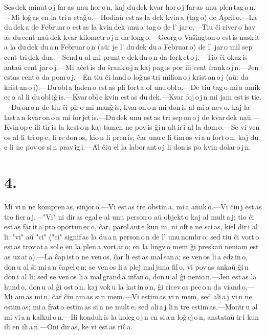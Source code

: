 \documentclass[ngerman,12pt,twoside]{book}
\begin{document}
Ses\,dek minut\,o\,j far\,as unu hor\,o\,n, kaj du\,dek kvar hor\,o\,j far\,as unu plen\,tag\,o\,n.---Mi loĝ\,as en la tri\,a etaĝ\,o.---Hodiaŭ est\,as la dek kvin\,a (tag\,o) de April\,o.---La du\,dek\,a de Februar\,o est\,as la kvin\,dek unu\,a tag\,o de l' jar\,o.---Tiu ĉi river\,o hav\,as du\,cent naŭ\,dek kvar kilometr\,o\,j\,n da long\,o.---Georg\,o Vaŝington\,o est\,is nask\,it\,a la du\,dek du\,a\,n Februar\,o\,n (aŭ: je l' du\,dek du\,a Februar\,o) de l' jar\,o mil sep\,cent tri\,dek dua.---Send\,u al mi prunt\,e dek\,du\,o\,n da fork\,et\,o\,j.---Tio ĉi okaz\,is antaŭ cent jar\,o\,j.---Mi aĉet\,is du ŝrank\,o\,j\,n kaj pag\,is por ili cent frank\,o\,j\,n.---Jen estas cent\,o da pom\,o\,j.---En tiu ĉi land\,o loĝ\,as tri milion\,o\,j krist\,an\,o\,j (aŭ: da krist\,an\,o\,j).---Du\,obl\,a faden\,o est\,as pli fort\,a ol unu\,obl\,a.---De tiu tag\,o mi\,a amik\,ec\,o al li du\,obl\,iĝ\,is.---Kvar\,obl\,e kvin est\,as du\,dek.---Kvar foj\,o\,j\,n mi jam est\,is tie.---Du\,on\,o\,n de tiu ĉi pir\,o mi manĝ\,is, kvar\,on\,o\,n mi don\,is al mi\,a nev\,o, kaj la last\,a\,n kvar\,on\,o\,n mi for\,ĵet\,is.---Du\,dek unu est\,as tri sep\,on\,o\,j de kvar\,dek naŭ.---Kvin\,op\,e ili tir\,is la kest\,o\,n kaj tamen ne pov\,is ĝi\,n alt\,ir\,i al la dom\,o.---Se vi ven\,os al li tri\,op\,e, li re\,don\,os, kio\,n li pren\,is; ĉar unu\,e li tim\,os vi\,a\,n fort\,o\,n, kaj du\,e li ne pov\,os si\,n prav\,ig\,i.---Al ĉiu el la labor\,ant\,o\,j li don\,is po kvin dolar\,o\,j\,n. 

\section*{4.}

Mi vi\,n ne kompren\,as, sinjor\,o.---Vi est\,as tre obstin\,a, mi\,a amik\,o.---Vi ĉiu\,j est\,as tro fier\,a\,j.---"Vi" ni dir\,as egal\,e al unu person\,o aŭ objekt\,o kaj al mult\,a\,j; tio ĉi est\,as far\,it\,a pro oportun\,ec\,o, ĉar, parol\,ant\,e kun iu, ni oft\,e ne sci\,as, kiel dir\,i al li: "vi" aŭ "ci" ("ci" signif\,as la du\,a\,n person\,o\,n de l' unu\,nombr\,o; sed tiu ĉi vort\,o est\,as trov\,at\,a sol\,e en la plen\,a vort\,ar\,o; en la lingv\,o mem ĝi preskaŭ neniam est\,as uz\,at\,a).---La ĉap\,ist\,o ne ven\,os, ĉar li est\,as mal\,san\,a; se ven\,os li\,a edz\,in\,o, don\,u al ŝi mi\,a\,n ĉapel\,o\,n; se ven\,os li\,a plej mal\,juna fil\,o, vi pov\,as ankaŭ ĝi\,n don\,i al li; sed se ven\,os li\,a mal\,grand\,a infan\,o, don\,u al ĝi nenio\,n.---Jen est\,as la hund\,o, don\,u al ĝi ost\,o\,n, kaj vok\,u la kat\,in\,o\,n, ĝi ricev\,os pec\,o\,n da viand\,o.---Mi am\,as mi\,n, ĉar ĉiu am\,as si\,n mem.---Vi estim\,as vi\,n mem, sed ali\,a\,j vi\,n ne estim\,as; mi\,a frat\,o estim\,as si\,n ne mult\,e, sed ali\,a\,j li\,n tre estim\,as.---Montr\,u al mi vi\,a\,n kalkul\,o\,n.---Ili konduk\,is la koleg\,o\,j\,n en si\,a\,n loĝ\,ej\,o\,n, anstataŭ ir\,i kun ili en ili\,a\,n.---Oni dir\,as, ke vi est\,as riĉ\,a. 
\end{document}
